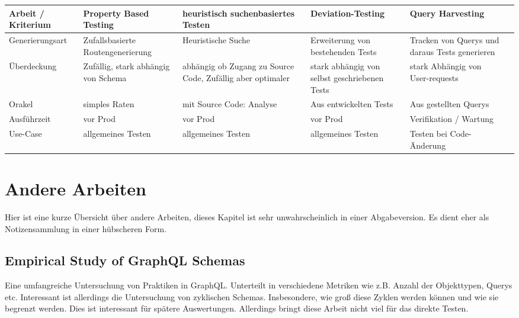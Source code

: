 \begin{center}
    \begin{table}[!ht]
        \begin{tabularx}{\textwidth}{|C|C|C|C|C|C|}
            \hline
            \textbf{ Arbeit / Kriterium} & \textbf{Property Based Testing} & \textbf{heuristisch suchenbasiertes Testen} & \textbf{Deviation-Testing} & \textbf{Query Harvesting} \\
            \hline
            Generierungsart & Zufallsbasierte Routengenerierung & Heuristische Suche & Erweiterung von bestehenden Tests & Tracken von Querys und daraus Tests generieren \\
            \hline
            Überdeckung & Zufällig, stark abhängig von Schema  & abhängig ob Zugang zu Source Code, Zufällig aber optimaler & stark abhängig von selbst geschriebenen Tests  & stark Abhängig von User-requests  \\
            \hline
            Orakel & simples Raten & mit Source Code: Analyse & Aus entwickelten Tests &  Aus gestellten Querys \\
            \hline
            Ausführzeit & vor Prod & vor Prod & vor Prod & Verifikation / Wartung \\
            \hline
            Use-Case & allgemeines Testen & allgemeines Testen & allgemeines Testen & Testen bei Code-Änderung \\
            \hline
        \end{tabularx}
    \end{table}
\end{center}

\section{Andere Arbeiten}
Hier ist eine kurze Übersicht über andere Arbeiten, dieses Kapitel ist sehr unwahrscheinlich in einer Abgabeversion.
Es dient eher als Notizensammlung in einer hübscheren Form.

\subsection{Empirical Study of GraphQL Schemas}
Eine umfangreiche Untersuchung von Praktiken in GraphQL. Unterteilt in verschiedene Metriken wie z.B.
Anzahl der Objekttypen, Querys etc.
Interessant ist allerdings die Untersuchung von zyklischen Schemas. Insbesondere, wie groß diese Zyklen
werden können und wie sie begrenzt werden. Dies ist interessant für spätere Auswertungen. Allerdings bringt
diese Arbeit nicht viel für das direkte Testen.

